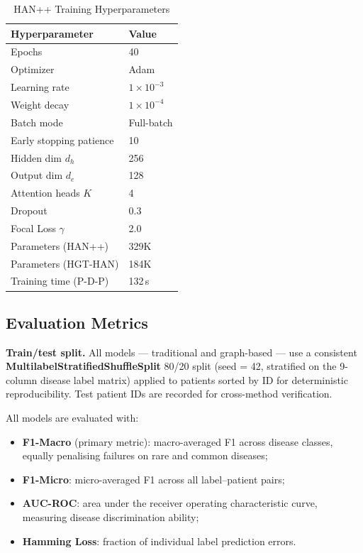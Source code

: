 \documentclass[conference]{IEEEtran}
\begin{document}
\begin{table}[h]
  \caption{HAN++ Training Hyperparameters}
  \label{tab:hyperparams}
  \centering
  \begin{tabular}{ll}
    \toprule
    \textbf{Hyperparameter}   & \textbf{Value}           \\
    \midrule
    Epochs                    & 40                       \\
    Optimizer                 & Adam                     \\
    Learning rate             & $1 \times 10^{-3}$       \\
    Weight decay              & $1 \times 10^{-4}$       \\
    Batch mode                & Full-batch               \\
    Early stopping patience   & 10                       \\
    Hidden dim $d_h$          & 256                      \\
    Output dim $d_e$          & 128                      \\
    Attention heads $K$       & 4                        \\
    Dropout                   & 0.3                      \\
    Focal Loss $\gamma$       & 2.0                      \\
    Parameters (HAN++)        & 329K                     \\
    Parameters (HGT-HAN)      & 184K                     \\
    Training time (P-D-P)     & 132\,s                   \\
    \bottomrule
  \end{tabular}
\end{table}

\subsection{Evaluation Metrics}
\label{subsec:metrics}

\textbf{Train/test split.}
All models --- traditional and graph-based --- use a consistent
\textbf{MultilabelStratifiedShuffleSplit} 80/20 split
(seed = 42, stratified on the 9-column disease label matrix) applied to
patients sorted by ID for deterministic reproducibility.
Test patient IDs are recorded for cross-method verification.

All models are evaluated with:
\begin{itemize}
  \item \textbf{F1-Macro} (primary metric): macro-averaged F1 across disease
        classes, equally penalising failures on rare and common diseases;
  \item \textbf{F1-Micro}: micro-averaged F1 across all label--patient pairs;
  \item \textbf{AUC-ROC}: area under the receiver operating characteristic
        curve, measuring disease discrimination ability;
  \item \textbf{Hamming Loss}: fraction of individual label prediction errors.
\end{itemize}
\end{document}
